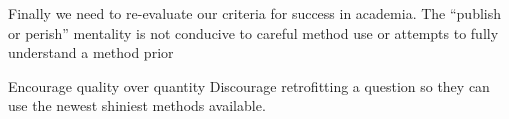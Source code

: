 \documentclass[a4paper,12pt]{article}
\begin{document}
Finally we need to re-evaluate our criteria for success in academia. The ``publish or perish'' mentality is not conducive to careful method use or attempts to fully understand a method prior







Encourage quality over quantity %
Discourage retrofitting a question so they can use the newest shiniest methods available. 


%




\end{document}
